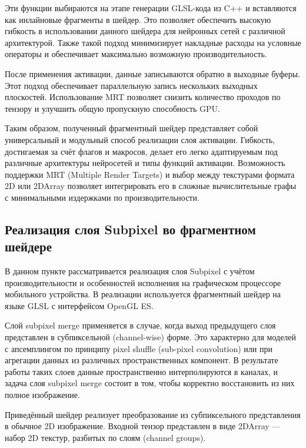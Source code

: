 \documentclass[a4paper,14pt]{extreport}
\begin{document}
            Эти функции выбираются на этапе генерации GLSL-кода из C++ и вставляются как инлайновые фрагменты в шейдер. Это позволяет обеспечить высокую гибкость в использовании данного шейдера для нейронных сетей с различной архитектурой. Также такой подход минимизирует накладные расходы на условные операторы и обеспечивает максимально возможную производительность.
            
            После применения активации, данные записываются обратно в выходные буферы. Этот подход обеспечивает параллельную запись нескольких выходных плоскостей. Использование MRT позволяет снизить количество проходов по тензору и улучшить общую пропускную способность GPU.
            
            
            Таким образом, полученный фрагментный шейдер представляет собой универсальный и модульный способ реализации слоя активации. Гибкость, достигаемая за счёт флагов и макросов, делает его легко адаптируемым под различные архитектуры нейросетей и типы функций активации. Возможность поддержки MRT (Multiple Render Targets) и выбор между текстурами формата 2D или 2DArray позволяет интегрировать его в сложные вычислительные графы с минимальными издержками по производительности.
        
        \subsection{Реализация слоя Subpixel во фрагментном шейдере}
            В данном пункте рассматривается реализация слоя Subpixel с учётом производительности и особенностей исполнения на графическом процессоре мобильного устройства. В реализации используется фрагментный шейдер на языке GLSL с интерфейсом OpenGL ES.
            
            Слой subpixel merge применяется в случае, когда выход предыдущего слоя представлен в субпиксельной (channel-wise) форме. Это характерно для моделей с апсемплингом по принципу pixel shuffle (sub-pixel convolution) или при агрегации данных из различных пространственных компонент. В результате работы таких слоев данные пространственно интерполируются в каналах, и задача слоя subpixel merge состоит в том, чтобы корректно восстановить из них полное изображение.
    
            Приведённый шейдер реализует преобразование из субпиксельного представления в обычное 2D изображение. Входной тензор представлен в виде 2DArray — набор 2D текстур, разбитых по слоям (channel groups).
            
\end{document}
